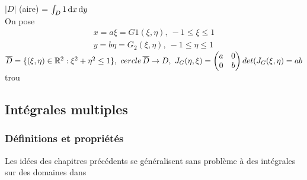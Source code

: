 \documentclass[12pt,a4paper]{article}
\begin{document}
$|D|$ (aire) = $\int_D 1 \, \mathrm d x\, \mathrm d y$\\
On pose
\begin{align*}
x=a\xi = G1(\xi,\eta),\ -1 \leq \xi \leq 1\\
y = b\eta = G_2(\xi,\eta),\ -1\leq \eta \leq 1
\end{align*}
$\overline{D} = \{(\xi,\eta) \in \mathbb{R}^2 : \xi^2+\eta^2 \leq 1\},\ cercle\, \overline{D} \to D,\ J_G(\eta,\xi) = \begin{pmatrix}
a&0\\
0&b
\end{pmatrix}\\
det(J_G(\xi,\eta) = ab$
{trou}

\subsection{Intégrales multiples}
\subsubsection{Définitions et propriétés}
Les idées des chapitres précédents se généralisent sans problème à des intégrales sur des domaines dans \rn
\end{document}
